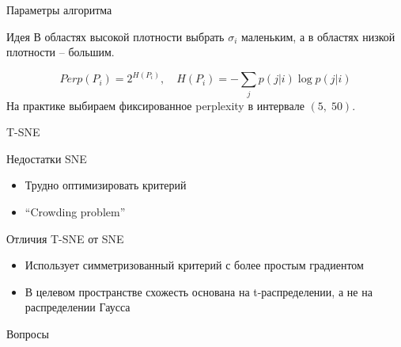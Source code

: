 \documentclass[10pt]{beamer}
\begin{document}
\begin{frame}{Параметры алгоритма}

\begin{exampleblock}{Идея}
В областях высокой плотности выбрать $\sigma_i$ маленьким, а в областях низкой плотности -- большим.
\end{exampleblock}
\[
Perp(P_i) = 2^{H(P_i)}, \quad H(P_i) = - \sum_j p(j | i) \log p(j | i)
\]
На практике выбираем фиксированное perplexity в интервале $(5, \; 50)$.


\end{frame}

\begin{frame}{T-SNE}

Недостатки SNE
\begin{itemize}
\item Трудно оптимизировать критерий
\item ``Crowding problem''
\end{itemize}

\vspace{1em}
Отличия T-SNE от SNE
\begin{itemize}
\item Использует симметризованный критерий с более простым градиентом
\item В целевом пространстве схожесть основана на t-распределении, а не на распределении Гаусса
\end{itemize}

\end{frame}

\begin{frame}[plain]
\begin{center}
{\Large Вопросы}
\end{center}
\end{frame}
\end{document}
